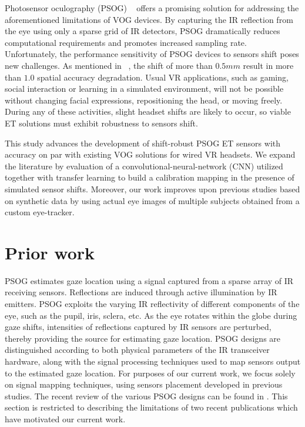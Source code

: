 Photosensor oculography (PSOG) ~\cite{torok1951lxxx} offers a promising solution for addressing the aforementioned limitations of VOG devices.  By capturing the IR reflection from the eye using only a sparse grid of IR detectors, PSOG dramatically reduces computational requirements and promotes increased sampling rate. Unfortunately, the performance sensitivity of PSOG devices to sensors shift poses new challenges. As mentioned in ~\cite{rigas2017hybrid}, the shift of more than $0.5mm$ result in more than $1.0$\textdegree{} spatial accuracy degradation. Usual VR applications, such as gaming, social interaction or learning in a simulated environment, will not be possible without changing facial expressions, repositioning the head, or moving freely. During any of these activities, slight headset shifts are likely to occur, so viable ET solutions must exhibit robustness to sensors shift.

This study advances the development of shift-robust PSOG ET sensors with accuracy on par with existing VOG solutions for wired VR headsets. We expand the literature by evaluation of a convolutional-neural-network (CNN) utilized together with transfer learning to build a calibration mapping in the presence of simulated sensor shifts. Moreover, our work improves upon previous studies based on synthetic data by using actual eye images of multiple subjects obtained from a custom eye-tracker.    

\section{Prior work}

PSOG estimates gaze location using a signal captured from a sparse array of IR receiving sensors. Reflections are induced through active illumination by IR emitters.  PSOG exploits the varying IR reflectivity of different components of the eye, such as the pupil, iris, sclera, etc. As the eye rotates within the globe during gaze shifts, intensities of reflections captured by IR sensors are perturbed, thereby providing the source for estimating gaze location. PSOG designs are distinguished according to both physical parameters of the IR transceiver hardware, along with the signal processing techniques used to map sensors output to the estimated gaze location. For purposes of our current work, we focus solely on signal mapping techniques, using sensors placement developed in previous studies. The recent review of the various PSOG designs can be found in \cite{rigas2018photosensor}. This section is restricted to describing the limitations of two recent publications which have motivated our current work.

